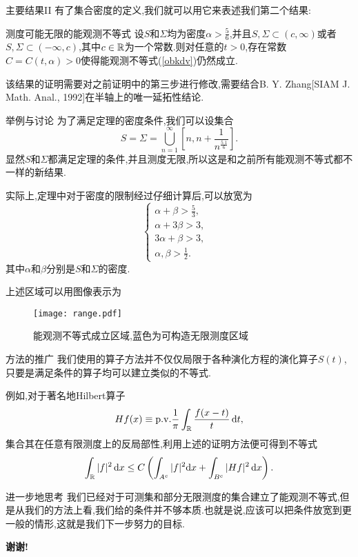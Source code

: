 \begin{frame}[t]{主要结果II}
  有了集合密度的定义,我们就可以用它来表述我们第二个结果:
  \begin{alertblock}{测度可能无限的能观测不等式}
    设$S$和$\Sigma$均为密度$\alpha>\frac{5}{6}$,并且$S,\Sigma \subset (c,\infty)$或者$S,\Sigma\subset (-\infty,c)$,其中$c\in \mathbb{R}$为一个常数.则对任意的$t>0$,存在常数$C=C(t,\alpha)>0$使得能观测不等式(\ref{obkdv})仍然成立.
  \end{alertblock}
  该结果的证明需要对之前证明中的第三步进行修改,需要结合B. Y. Zhang[SIAM J. Math. Anal., 1992]在半轴上的唯一延拓性结论.
\end{frame}

\begin{frame}[t]{举例与讨论}
  为了满足定理的密度条件,我们可以设集合
  \begin{equation}
    S=\Sigma=\bigcup_{n=1}^{\infty}[n,n+\frac{1}{n^{\frac{5.1}{6}}}].
  \end{equation}
  显然$S$和$\Sigma$都满足定理的条件,并且测度无限,所以这是和之前所有能观测不等式都不一样的新结果.

  实际上,定理中对于密度的限制经过仔细计算后,可以放宽为
  \begin{equation}
    \begin{cases}
      \alpha+\beta>\frac{5}{3}, &\\
      \alpha+3\beta>3, &\\
      3\alpha+\beta>3,&\\
      \alpha,\beta>\frac{1}{2}.&

    \end{cases}
  \end{equation}
  其中$\alpha$和$\beta$分别是$S$和$\Sigma$的密度.
\end{frame}
\begin{frame}[t]
  上述区域可以用图像表示为
  \begin{figure}[ht]
    \texttt{[image: range.pdf]}
    \centering
    \caption{能观测不等式成立区域,蓝色为可构造无限测度区域}
    \label{fig1}
    \end{figure}
\end{frame}
\begin{frame}[t]{方法的推广}
  我们使用的算子方法并不仅仅局限于各种演化方程的演化算子$S(t)$,只要是满足条件的算子均可以建立类似的不等式.

  例如,对于著名地Hilbert算子
  \begin{equation}
    Hf(x)\equiv \mathrm{p.v.}\frac{1}{\pi}\int_{\mathbb{R}}\frac{f(x-t)}{t}\,\mathrm{d} t,
  \end{equation}
  集合其在任意有限测度上的反局部性,利用上述的证明方法便可得到不等式
  \begin{equation}
    \int_{\mathbb{R}}|f|^2\,\mathrm{d} x\le C\left(\int_{A^c} |f|^2\mathrm{d} x+\int_{B^c}|Hf|^2\,\mathrm{d} x\right).
  \end{equation}
\end{frame}

\begin{frame}[t]{进一步地思考}
  我们已经对于可测集和部分无限测度的集合建立了能观测不等式,但是从我们的方法上看,我们给的条件并不够本质.也就是说,应该可以把条件放宽到更一般的情形,这就是我们下一步努力的目标.
  \begin{center}
   \Huge\bf 谢谢!
  \end{center}
\end{frame}
